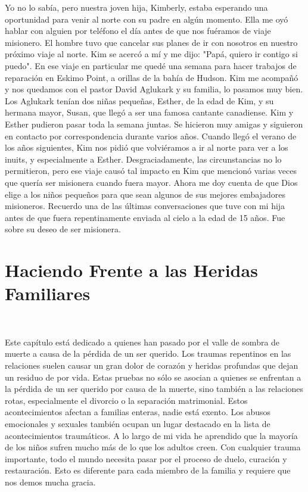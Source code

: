 \documentclass[twoside, 12pt]{book}
\begin{document}
Yo no lo sabía, pero nuestra joven hija, Kimberly, estaba esperando una oportunidad para venir al norte con su padre en algún momento. Ella me oyó hablar con alguien por teléfono el día antes de que nos fuéramos de viaje misionero. El hombre tuvo que cancelar sus planes de ir con nosotros en nuestro próximo viaje al norte.  Kim se acercó a mí y me dijo: "Papá, quiero ir contigo si puedo". En ese viaje en particular me quedé una semana para hacer trabajos de reparación en Eskimo Point, a orillas de la bahía de Hudson. Kim me acompañó y nos quedamos con el pastor David Aglukark y su familia, lo pasamos muy bien. Los Aglukark tenían dos niñas pequeñas, Esther, de la edad de Kim, y su hermana mayor, Susan, que llegó a ser una famosa cantante canadiense. Kim y Esther pudieron pasar toda la semana juntas. Se hicieron muy amigas y siguieron en contacto por correspondencia durante varios años. Cuando llegó el verano de los años siguientes, Kim nos pidió que volviéramos a ir al norte para ver a los inuits, y especialmente a Esther. Desgraciadamente, las circunstancias no lo permitieron, pero ese viaje causó tal impacto en Kim que mencionó varias veces que quería ser misionera cuando fuera mayor. Ahora me doy cuenta de que Dios elige a los niños pequeños para que sean algunos de sus mejores embajadores misioneros. Recuerdo una de las últimas conversaciones que tuve con mi hija antes de que fuera repentinamente enviada al cielo a la edad de 15 años. Fue sobre su deseo de ser misionera.\\



\chapter{Haciendo Frente a las Heridas Familiares}
\

Este capítulo está dedicado a quienes han pasado por el valle de sombra de muerte a causa de la pérdida de un ser querido. Los traumas repentinos en las relaciones suelen causar un gran dolor de corazón y heridas profundas que dejan un residuo de por vida. Estas pruebas no sólo se asocian a quienes se enfrentan a la pérdida de un ser querido por causa de la muerte, sino también a las relaciones rotas, especialmente el divorcio o la separación matrimonial. Estos acontecimientos afectan a familias enteras, nadie está exento. Los abusos emocionales y sexuales también ocupan un lugar destacado en la lista de acontecimientos traumáticos. A lo largo de mi vida he aprendido que la mayoría de los niños sufren mucho más de lo que los adultos creen. Con cualquier trauma importante, todo el mundo necesita pasar por el proceso de duelo, curación y restauración. Esto es diferente para cada miembro de la familia y requiere que nos demos mucha gracia.\\
\end{document}
